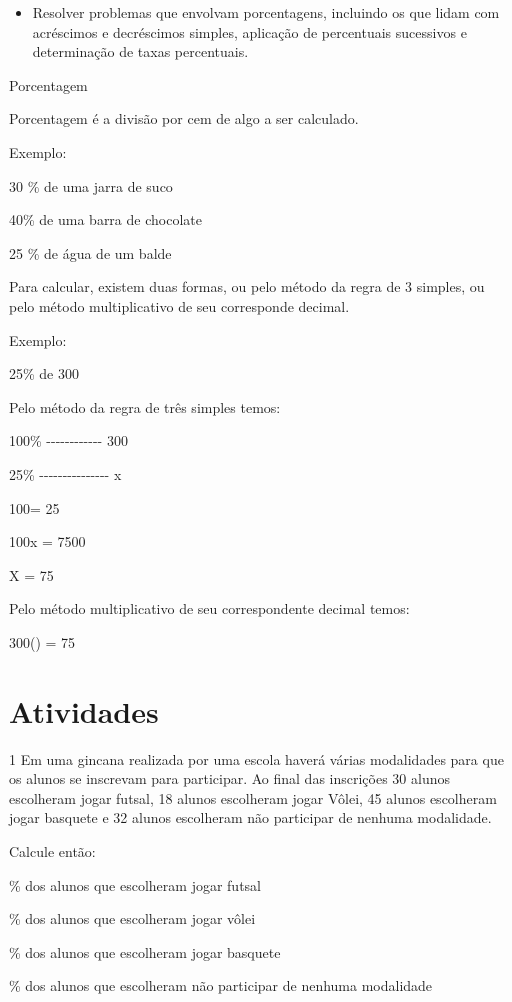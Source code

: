 \begin{itemize}
\tightlist

\item 
  Resolver problemas que envolvam porcentagens, incluindo os que lidam
  com acréscimos e decréscimos simples, aplicação de percentuais
  sucessivos e determinação de taxas percentuais.
\end{itemize}

Porcentagem

Porcentagem é a divisão por cem de algo a ser calculado.

Exemplo:

30 \% de uma jarra de suco

40\% de uma barra de chocolate

25 \% de água de um balde

Para calcular, existem duas formas, ou pelo método da regra de 3
simples, ou pelo método multiplicativo de seu corresponde decimal.

Exemplo:

25\% de 300

Pelo método da regra de três simples temos:

100\% -\/-\/-\/-\/-\/-\/-\/-\/-\/-\/-\/- 300

25\% -\/-\/-\/-\/-\/-\/-\/-\/-\/-\/-\/-\/-\/-\/- x

100\times = 25

100x = 7500

X = 75

Pelo método multiplicativo de seu correspondente decimal temos:

300\times () = 75

\section{Atividades}

\num{1} Em uma gincana realizada por uma escola haverá várias modalidades
para que os alunos se inscrevam para participar. Ao final das inscrições
30 alunos escolheram jogar futsal, 18 alunos escolheram jogar Vôlei, 45
alunos escolheram jogar basquete e 32 alunos escolheram não participar
de nenhuma modalidade.

Calcule então:

\item \% dos alunos que escolheram jogar futsal
\item \% dos alunos que escolheram jogar vôlei
\item \% dos alunos que escolheram jogar basquete
\item \% dos alunos que escolheram não participar de nenhuma modalidade

